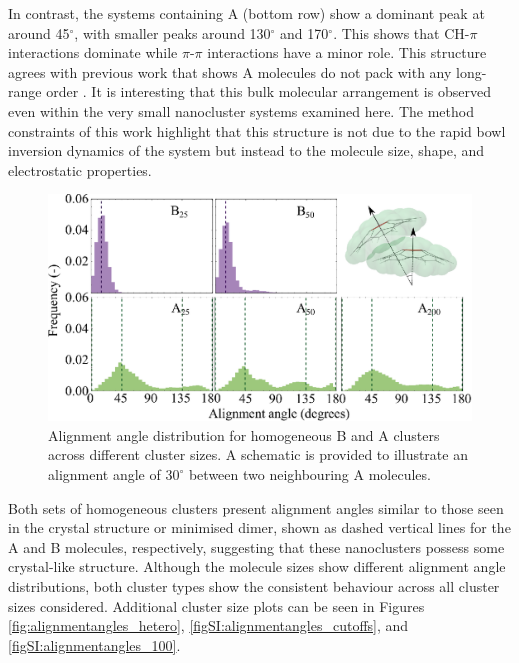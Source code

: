 In contrast, the systems containing A (bottom row) show a dominant peak at around 45$^{\circ}$, with smaller peaks around 130$^{\circ}$ and 170$^{\circ}$. This shows that CH-$\pi$ interactions dominate while $\pi$-$\pi$ interactions have a minor role. This structure agrees with previous work that shows A molecules do not pack with any long-range order \cite{hanson1976crystal,Petrukhina2005,kanao2018differentiating,wang2015electronic,scott1999geodesic}. It is interesting that this bulk molecular arrangement is observed even within the very small nanocluster systems examined here. The method constraints of this work highlight that this structure is not due to the rapid bowl inversion dynamics of the system but instead to the molecule size, shape, and electrostatic properties.
%
\begin{figure}[!tbh]
\centering
\includegraphics[width=0.5\linewidth]{Figures/alignment_angles_homo.eps}
\caption{Alignment angle distribution for homogeneous B and A clusters across different cluster sizes. A schematic is provided to illustrate an alignment angle of $30^{\circ}$ between two neighbouring A molecules.}
\label{fig:alignmentangles_homo}
\end{figure}
%
Both sets of homogeneous clusters present alignment angles similar to those seen in the crystal structure or minimised dimer, shown as dashed vertical lines for the A and B molecules, respectively, suggesting that these nanoclusters possess some crystal-like structure.  Although the molecule sizes show different alignment angle distributions, both cluster types show the consistent behaviour across all cluster sizes considered. Additional cluster size plots can be seen in Figures \ref{fig:alignmentangles_hetero}, \ref{figSI:alignmentangles_cutoffs}, and \ref{figSI:alignmentangles_100}.

